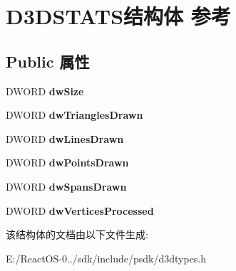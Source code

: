 \hypertarget{struct_d3_d_s_t_a_t_s}{}\section{D3\+D\+S\+T\+A\+T\+S结构体 参考}
\label{struct_d3_d_s_t_a_t_s}
\subsection*{Public 属性}
\begin{DoxyCompactItemize}
\item 
\mbox{\label{struct_d3_d_s_t_a_t_s_a59024ed30becad1a5c4f2a105641adde}} 
D\+W\+O\+RD {\bfseries dw\+Size}
\item 
\mbox{\label{struct_d3_d_s_t_a_t_s_a1268b6fcd27c833f7dcc8878b064f5e7}} 
D\+W\+O\+RD {\bfseries dw\+Triangles\+Drawn}
\item 
\mbox{\label{struct_d3_d_s_t_a_t_s_a1e16cfe61f8668a947027c0dad1cffe2}} 
D\+W\+O\+RD {\bfseries dw\+Lines\+Drawn}
\item 
\mbox{\label{struct_d3_d_s_t_a_t_s_ac667ff4c8898e76e45ee633edbf6cccf}} 
D\+W\+O\+RD {\bfseries dw\+Points\+Drawn}
\item 
\mbox{\label{struct_d3_d_s_t_a_t_s_ad0f7d06575be5ecec88e155d23cc40b5}} 
D\+W\+O\+RD {\bfseries dw\+Spans\+Drawn}
\item 
\mbox{\label{struct_d3_d_s_t_a_t_s_ab38553d7921b44d60835f059a0edb0bf}} 
D\+W\+O\+RD {\bfseries dw\+Vertices\+Processed}
\end{DoxyCompactItemize}


该结构体的文档由以下文件生成\+:\begin{DoxyCompactItemize}
\item 
E\+:/\+React\+O\+S-\/0../sdk/include/psdk/d3dtypes.\+h\end{DoxyCompactItemize}
